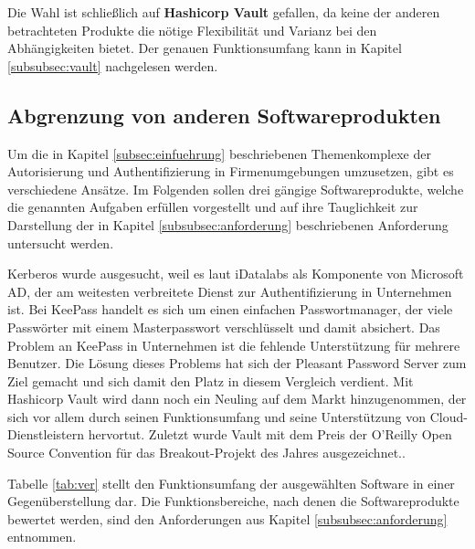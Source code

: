 \documentclass[
book,
a4paper,   
titlepage,  
halfparskip,
12pt        
]{scrartcl}
\begin{document}
\begin{onehalfspacing}
Die Wahl ist schließlich auf \textbf{Hashicorp Vault} gefallen, da keine der anderen betrachteten Produkte die nötige Flexibilität und Varianz bei den Abhängigkeiten bietet. Der genauen Funktionsumfang kann in Kapitel \vref{subsubsec:vault} nachgelesen werden.

\subsection{Abgrenzung von anderen Softwareprodukten}
Um die in Kapitel \vref{subsec:einfuehrung} beschriebenen Themenkomplexe der Autorisierung und Authentifizierung in Firmenumgebungen umzusetzen, gibt es verschiedene Ansätze. Im Folgenden sollen drei gängige Softwareprodukte, welche die genannten Aufgaben erfüllen vorgestellt und auf ihre Tauglichkeit zur Darstellung der in Kapitel \vref{subsubsec:anforderung} beschriebenen Anforderung untersucht werden.

Kerberos wurde ausgesucht, weil es laut iDatalabs als Komponente von Microsoft \ac{AD}, der am weitesten verbreitete Dienst zur Authentifizierung in Unternehmen ist\cite{datalabs}. Bei KeePass handelt es sich um einen einfachen Passwortmanager, der viele Passwörter mit einem Masterpasswort verschlüsselt und damit absichert. Das Problem an KeePass in Unternehmen ist die fehlende Unterstützung für mehrere Benutzer. Die Lösung dieses Problems hat sich der Pleasant Password Server zum Ziel gemacht und sich damit den Platz in diesem Vergleich verdient. Mit Hashicorp Vault wird dann noch ein Neuling auf dem Markt hinzugenommen, der sich vor allem durch seinen Funktionsumfang und seine Unterstützung von Cloud-Dienstleistern hervortut. Zuletzt wurde Vault mit dem Preis der O'Reilly Open Source Convention für das Breakout-Projekt des Jahres ausgezeichnet.\cite{award}.

Tabelle \vref{tab:ver} stellt den Funktionsumfang der ausgewählten Software in einer Gegenüberstellung dar. Die Funktionsbereiche, nach denen die Softwareprodukte bewertet werden, sind den Anforderungen aus Kapitel \vref{subsubsec:anforderung} entnommen.


\end{onehalfspacing}
\end{document}

